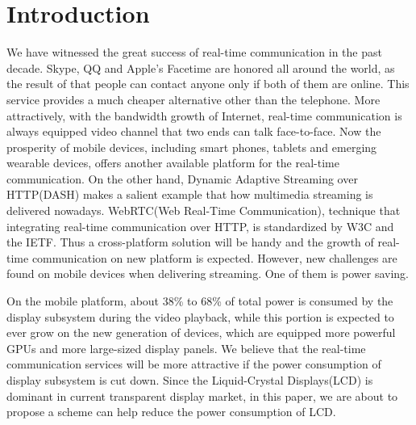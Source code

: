 \section{Introduction}


We have witnessed the great success of real-time communication in the
past decade. Skype, QQ and Apple's Facetime are honored all around the
world, as the result of that people can contact anyone only if both of
them are online. This service provides a much cheaper alternative
other than the telephone. More attractively, with the bandwidth growth
of Internet, real-time communication is always equipped video channel
that two ends can talk face-to-face. Now the prosperity of mobile
devices, including smart phones, tablets and emerging wearable
devices, offers another available platform for the real-time
communication. On the other hand, Dynamic Adaptive Streaming over
HTTP(DASH) makes a salient example that how multimedia streaming is
delivered nowadays. WebRTC(Web Real-Time Communication), technique
that integrating real-time communication over HTTP, is standardized by
W3C and the IETF. Thus a cross-platform solution will be handy and the
growth of real-time communication on new platform is
expected. However, new challenges are found on mobile devices when
delivering streaming. One of them is power saving. 


On the mobile platform, about 38\% to 68\% of total power is consumed
by the display subsystem during the video playback, while this portion
is expected to ever grow on the new generation of devices, which are
equipped more powerful GPUs and more large-sized display panels. We
believe that the real-time communication services will be more
attractive if the power consumption of display subsystem is cut
down. Since the Liquid-Crystal Displays(LCD) is dominant in current
transparent display market, in this paper, we are about to propose a
scheme can help reduce the power consumption of LCD. 


